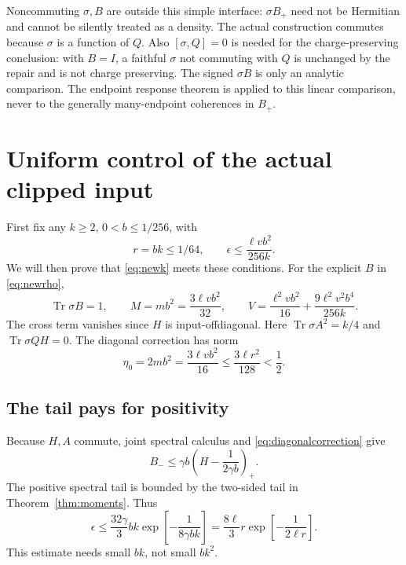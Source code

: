 \documentclass[11pt]{article}
\newcommand{\Tr}{\operatorname{Tr}}
\begin{document}
Noncommuting \(\sigma,B\) are outside this simple interface:
\(\sigma B_+\) need not be Hermitian and cannot be silently treated as a density.
The actual construction commutes because \(\sigma\) is a function of \(Q\).
Also \([\sigma,Q]=0\) is needed for the charge-preserving conclusion:
with \(B=I\), a faithful \(\sigma\) not commuting with \(Q\) is unchanged by
the repair and is not charge preserving.
The signed \(\sigma B\) is only an analytic comparison.
The endpoint response theorem is applied to this linear comparison, never
to the generally many-endpoint coherences in \(B_+\).

\section{Uniform control of the actual clipped input}

First fix any \(k\ge2\), \(0<b\le1/256\), with
\begin{equation}\label{eq:budget}
 r=bk\le1/64,\qquad
 \epsilon\le\frac{\ell vb^2}{256k}.
\end{equation}
We will then prove that \eqref{eq:newk} meets these conditions.
For the explicit \(B\) in \eqref{eq:newrho},
\[
 \Tr\sigma B=1,\qquad
 M=mb^2=\frac{3\ell vb^2}{32},\qquad
 V=\frac{\ell^2vb^2}{16}+\frac{9\ell^2v^2b^4}{256k}.
\]
The cross term vanishes since \(H\) is input-offdiagonal.
Here \(\Tr\sigma A^2=k/4\) and \(\Tr\sigma QH=0\).
The diagonal correction has norm
\begin{equation}\label{eq:diagonalcorrection}
 \eta_0=2mb^2=\frac{3\ell vb^2}{16}
       \le\frac{3\ell r^2}{128}<\frac12.
\end{equation}

\subsection{The tail pays for positivity}

Because \(H,A\) commute, joint spectral calculus and
\eqref{eq:diagonalcorrection} give
\[
 B_-\le\gamma b\left(H-\frac1{2\gamma b}\right)_+.
\]
The positive spectral tail is bounded by the two-sided tail in
Theorem~\ref{thm:moments}. Thus
\begin{equation}\label{eq:epsilonbound}
 \epsilon\le\frac{32\gamma}{3}bk
          \exp\!\left[-\frac1{8\gamma bk}\right]
 =\frac{8\ell}{3}r
          \exp\!\left[-\frac1{2\ell r}\right].
\end{equation}
This estimate needs small \(bk\), not small \(bk^2\).
\end{document}
